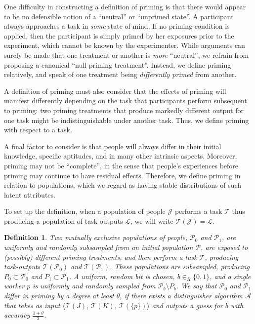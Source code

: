 \documentclass[a4paper]{report}
\newtheorem*{mydef}{Definition}
\begin{document}
One difficulty in constructing a definition of priming is that there would 
appear to be no defensible notion of a ``neutral'' or ``unprimed state''.  A 
participant 
always approaches a task in \textit{some} state of mind.  If no priming 
condition is applied, then the participant is simply primed by her
exposures prior to the experiment, which cannot be known by the experimenter.  
While arguments can surely be made that one treatment or another is 
\textit{more} 
``neutral'', we refrain from proposing a canonical ``null priming treatment''. 
Instead, we define priming relatively, and speak of one treatment being 
\textit{differently primed} from another.

A definition of priming must also consider that the effects of priming will
manifest differently depending on the task that participants perform 
subsequent to priming:  two priming treatments that
produce markedly different output for one task might be 
indistinguishable under another task.  Thus, we define priming
with respect to a task.

A final factor to consider is that people will always differ in their initial
knowledge, specific aptitudes, and in many other intrinsic aspects.  Moreover,
priming may not be ``complete'', in the sense that people's experiences before
priming may continue to have residual effects.  Therefore, we define priming 
in relation to populations, which we regard as having stable distributions of
such latent attributes.

To set up the definition, when a population of people $\mathcal{J}$ performs
a task $\mathcal{T}$ thus producing a population of task-outputs $\mathcal{L}$,
we will write $\mathcal{T}(\mathcal{J}) = \mathcal{L}$.

\vspace{2mm}
\begin{mydef}
	\upshape
	Two mutually exclusive populations of people, $\mathcal{P}_0$ and 
	$\mathcal{P}_1$, are uniformly and randomly subsampled from an initial 
	population $\mathcal{P}$, are exposed to (possibly) different priming 
	treatments, and then perform a task $\mathcal{T}$, 
	producing task-outputs $\mathcal{T}(\mathcal{P}_0)$ and 
	$\mathcal{T}(\mathcal{P}_1)$.
	These populations are subsampled, producing 
	$P_0 \subset \mathcal{P}_0$ and
	$P_1 \subset \mathcal{P}_1$. A uniform, random bit is chosen, 
	$b\in _R \{0,1\}$, and a single worker $p$ is uniformly and randomly 
	sampled from 
	$\mathcal{P}_b \setminus P_b$.
	We say that $\mathcal{P}_0$ and $\mathcal{P}_1$ 
	\emph{differ in priming by a degree at least $\theta$},
	if there exists a \emph{distinguisher algorithm} $\mathcal{A}$ that takes as input 
	$\langle\mathcal{T}(J)$, $\mathcal{T}(K)$, $\mathcal{T}(\{p\})\rangle$
	and outputs a guess for $b$ with accuracy $\frac{1+\theta}{2}$.  
\end{mydef}
\end{document}
